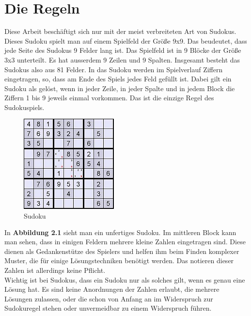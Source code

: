 \section{Die Regeln}
\label{Regeln}
Diese Arbeit beschäftigt sich nur mit der meist verbreiteten Art von Sudokus. Dieses Sudoku spielt man auf einem Spielfeld der Größe 9x9. Das beudeutet, dass jede Seite des Sudokus 9 Felder lang ist. Das Spielfeld ist in 9 Blöcke der Größe 3x3 unterteilt. Es hat ausserdem 9 Zeilen und 9 Spalten. Insgesamt besteht das Sudokus also aus 81 Felder. In das Sudoku werden im Spielverlauf Ziffern eingetragen, so, dass am Ende des Spiels jedes Feld gefüllt ist. Dabei gilt ein Sudoku als gelöst, wenn in jeder Zeile, in jeder Spalte und in jedem Block die Ziffern 1 bis 9 jeweils einmal vorkommen. Das ist die einzige Regel des Sudokuspiels.\\

\begin{figure}[h]
\begin{center}
\includegraphics{./img/sudoku.jpg}
\caption{Sudoku}
\end{center}
\end{figure}

\noindent In \textbf{Abbildung 2.1} sieht man ein unfertiges Sudoku. Im mittleren Block kann man sehen, dass in einigen Feldern mehrere kleine Zahlen eingetragen sind. Diese dienen als Gedankenstütze des Spielers und helfen ihm beim Finden komplexer Muster, die für einige Lösungstechniken benötigt werden. Das notieren dieser Zahlen ist allerdings keine Pflicht.\\
Wichtig ist bei Sudokus, dass ein Sudoku nur als solches gilt, wenn es genau eine Lösung hat. Es sind keine Anordnungen der Zahlen erlaubt, die mehrere Lösungen zulassen, oder die schon von Anfang an im Widerspruch zur Sudokuregel stehen oder unvermeidbar zu einem Widerspruch führen.\\